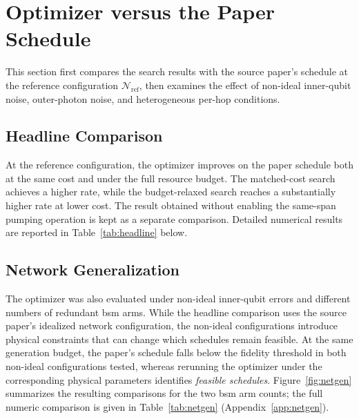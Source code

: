 \section{Optimizer versus the Paper Schedule}
\label{sec:exp:comparison}

This section first compares the search results with the source paper's schedule at the reference configuration $\mathcal{N}_\mathrm{ref}$, then examines the effect of non-ideal inner-qubit noise, outer-photon noise, and heterogeneous per-hop conditions.

\subsection{Headline Comparison}
\label{sec:exp:headline}


At the reference configuration, the optimizer improves on the paper schedule both at the same cost and under the full resource budget. The matched-cost search achieves a higher rate, while the budget-relaxed search reaches a substantially higher rate at lower cost. The result obtained without enabling the same-span pumping operation is kept as a separate comparison. Detailed numerical results are reported in Table~\ref{tab:headline} below.



\subsection{Network Generalization}
\label{sec:exp:netgen}


The optimizer was also evaluated under non-ideal inner-qubit errors and different numbers of redundant \Gls{bsm} arms. While the headline comparison uses the source paper's idealized network configuration, the non-ideal configurations introduce physical constraints that can change which schedules remain feasible. At the same generation budget, the paper's schedule falls below the fidelity threshold in both non-ideal configurations tested, whereas rerunning the optimizer under the corresponding physical parameters identifies \emph{feasible schedules}. Figure~\ref{fig:netgen} summarizes the resulting comparisons for the two \Gls{bsm} arm counts; the full numeric comparison is given in Table~\ref{tab:netgen} (Appendix~\ref{app:netgen}).

